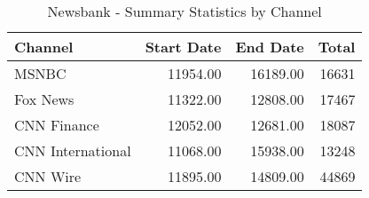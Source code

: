 \begin{table}[ht]
\centering
\caption{Newsbank - Summary Statistics by Channel} 
\label{tab:newsbank_channel}
\begin{tabular}{lrrr}
  \hline
Channel & Start Date & End Date & Total \\ 
  \hline
MSNBC & 11954.00 & 16189.00 & 16631 \\ 
  Fox News & 11322.00 & 12808.00 & 17467 \\ 
  CNN Finance & 12052.00 & 12681.00 & 18087 \\ 
  CNN International & 11068.00 & 15938.00 & 13248 \\ 
  CNN Wire & 11895.00 & 14809.00 & 44869 \\ 
   \hline
\end{tabular}
\end{table}
